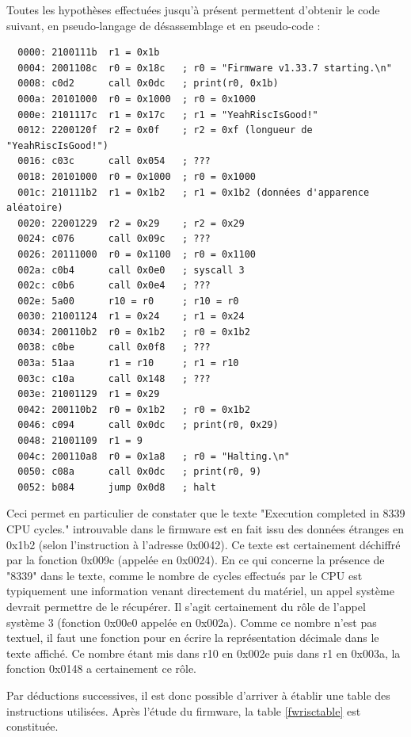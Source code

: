 \documentclass[a4paper,10pt]{article}
\begin{document}
Toutes les hypothèses effectuées jusqu'à présent permettent d'obtenir le code suivant, en pseudo-langage de désassemblage et en pseudo-code :
\begin{verbatim}
  0000: 2100111b  r1 = 0x1b
  0004: 2001108c  r0 = 0x18c   ; r0 = "Firmware v1.33.7 starting.\n"
  0008: c0d2      call 0x0dc   ; print(r0, 0x1b)
  000a: 20101000  r0 = 0x1000  ; r0 = 0x1000
  000e: 2101117c  r1 = 0x17c   ; r1 = "YeahRiscIsGood!"
  0012: 2200120f  r2 = 0x0f    ; r2 = 0xf (longueur de "YeahRiscIsGood!")
  0016: c03c      call 0x054   ; ???
  0018: 20101000  r0 = 0x1000  ; r0 = 0x1000
  001c: 210111b2  r1 = 0x1b2   ; r1 = 0x1b2 (données d'apparence aléatoire)
  0020: 22001229  r2 = 0x29    ; r2 = 0x29
  0024: c076      call 0x09c   ; ???
  0026: 20111000  r0 = 0x1100  ; r0 = 0x1100
  002a: c0b4      call 0x0e0   ; syscall 3
  002c: c0b6      call 0x0e4   ; ???
  002e: 5a00      r10 = r0     ; r10 = r0
  0030: 21001124  r1 = 0x24    ; r1 = 0x24
  0034: 200110b2  r0 = 0x1b2   ; r0 = 0x1b2
  0038: c0be      call 0x0f8   ; ???
  003a: 51aa      r1 = r10     ; r1 = r10
  003c: c10a      call 0x148   ; ???
  003e: 21001129  r1 = 0x29
  0042: 200110b2  r0 = 0x1b2   ; r0 = 0x1b2
  0046: c094      call 0x0dc   ; print(r0, 0x29)
  0048: 21001109  r1 = 9
  004c: 200110a8  r0 = 0x1a8   ; r0 = "Halting.\n"
  0050: c08a      call 0x0dc   ; print(r0, 9)
  0052: b084      jump 0x0d8   ; halt
\end{verbatim}

Ceci permet en particulier de constater que le texte "Execution completed in  8339 CPU cycles." introuvable dans le firmware est en fait issu des données étranges en 0x1b2 (selon l'instruction à l'adresse 0x0042). Ce texte est certainement déchiffré par la fonction 0x009c (appelée en 0x0024). En ce qui concerne la présence de "8339" dans le texte, comme le nombre de cycles effectués par le CPU est typiquement une information venant directement du matériel, un appel système devrait permettre de le récupérer. Il s'agit certainement du rôle de l'appel système 3 (fonction 0x00e0 appelée en 0x002a). Comme ce nombre n'est pas textuel, il faut une fonction pour en écrire la représentation décimale dans le texte affiché. Ce nombre étant mis dans r10 en 0x002e puis dans r1 en 0x003a, la fonction 0x0148 a certainement ce rôle.

Par déductions successives, il est donc possible d'arriver à établir une table des instructions utilisées. Après l'étude du firmware, la table \ref{fwrisctable} est constituée.
\end{document}
